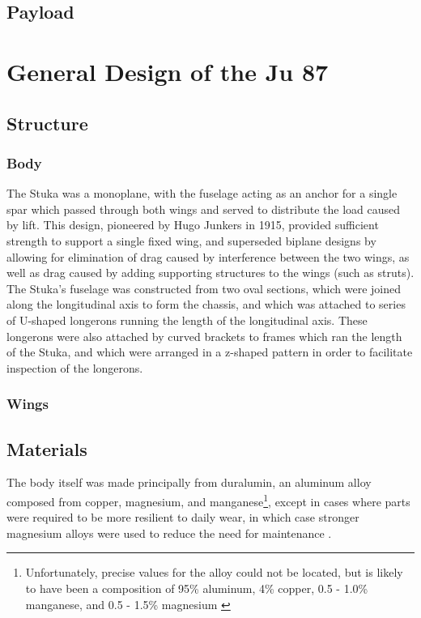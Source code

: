 \documentclass[a4paper, fontsize=11pt]{scrartcl} %
\begin{document}
\subsection{Payload}
\section{General Design of the Ju 87}
\subsection{Structure}
\subsubsection{Body}
The Stuka was a monoplane, with the fuselage acting as an
anchor for a single spar which passed through both wings and served to
distribute the load caused by lift.
This design, pioneered by Hugo Junkers in 1915, provided sufficient
strength to support a single fixed wing, and superseded
biplane designs by allowing for elimination of drag caused by interference
between the two wings, as well as drag caused by adding supporting structures
to the wings (such as struts). The Stuka's fuselage was constructed from two oval
sections, which were joined along the longitudinal axis to form the
chassis, and which was attached to series of U-shaped longerons running
the length of the longitudinal axis. These longerons were also attached
by curved brackets to frames which ran the length of the Stuka, and which were
arranged in a z-shaped pattern in order to facilitate inspection of
the longerons.
\subsubsection{Wings}

\subsection{Materials}

The body itself was made principally from
duralumin, an aluminum alloy composed from copper, magnesium, and
manganese\footnote{Unfortunately, precise values for the alloy could not
be located, but is likely to have been a composition of 95\% aluminum, 4\%
copper, 0.5 - 1.0\% manganese, and 0.5 - 1.5\%
magnesium \autocite[p.~102-103]{wardlaw33}},
except in cases where parts were required to be more resilient to daily
wear, in which case stronger magnesium alloys were used to reduce the
need for maintenance \autocite[p.~15]{guardia14}.
\end{document}
